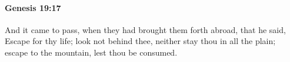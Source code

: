 
		\paragraph{Genesis 19:17} %
			\label{GENESIS-19-17}

			And it came to pass, when they had brought them forth abroad, that he said, Escape for thy life; look not behind thee, neither stay thou in all the plain; escape to the mountain, lest thou be consumed.


